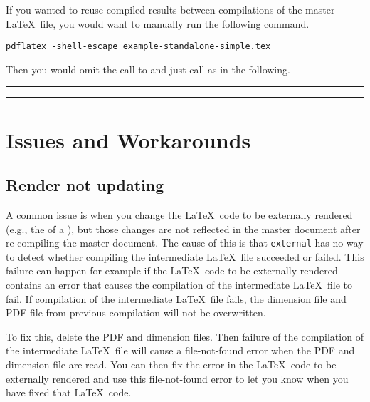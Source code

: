 \documentclass[10pt]{ltxdoc}
\newcommand{\pkg}[1]{\texttt{#1}}
\def\sz{%
  \rule{0.2em}{7pt}%
  \llap{\rule[8pt]{0.2em}{2pt}}%
}
\begin{document}
If you wanted to reuse compiled results between compilations of the
master \LaTeX\ file, you would want to manually run the following
command.

\begin{tcolorbox}
\begin{verbatim}
pdflatex -shell-escape example-standalone-simple.tex
\end{verbatim}
\end{tcolorbox}

Then you would omit the call to  and just call
 as in the following.

\begin{tcblisting}{}
\sz\ExternalRead[file=example-standalone-simple]\sz
\end{tcblisting}

\section{Issues and Workarounds}
\label{sec:Issues and Workarounds}

\subsection{Render not updating}
\label{subsec:Render not updating}

A common issue is when you change the \LaTeX\ code to be externally
rendered (e.g., the  of a ), but those changes
are not reflected in the master document after re-compiling the master
document.
The cause of this is that \pkg{external} has no way to detect whether
compiling the intermediate \LaTeX\ file succeeded or failed.
This failure can happen for example if the \LaTeX\ code to be
externally rendered contains an error that causes the compilation of
the intermediate \LaTeX\ file to fail.
If compilation of the intermediate \LaTeX\ file fails, the dimension
file and PDF file from previous compilation will not be overwritten.

To fix this, delete the PDF and dimension files.
Then failure of the compilation of the intermediate \LaTeX\ file will
cause a file-not-found error when the PDF and dimension file are read.
You can then fix the error in the \LaTeX\ code to be externally
rendered and use this file-not-found error to let you know when you
have fixed that \LaTeX\ code.
\end{document}
